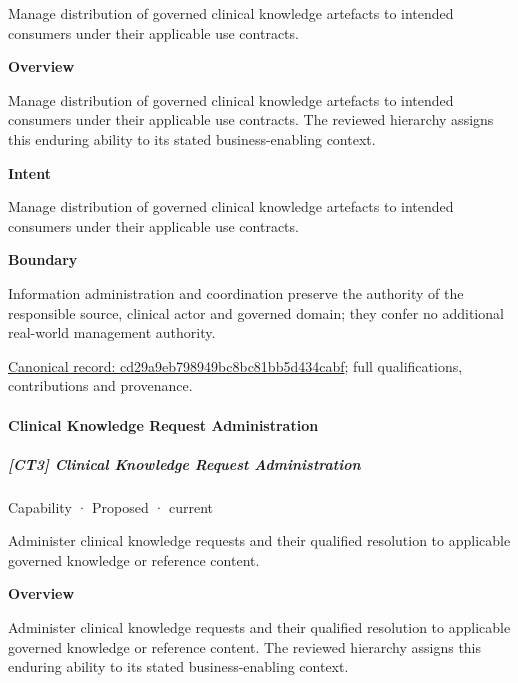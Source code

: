 Manage distribution of governed clinical knowledge artefacts to intended consumers under their applicable use contracts.



\textbf{Overview}



Manage distribution of governed clinical knowledge artefacts to intended consumers under their applicable use contracts. The reviewed hierarchy assigns this enduring ability to its stated business-enabling context.



\textbf{Intent}



Manage distribution of governed clinical knowledge artefacts to intended consumers under their applicable use contracts.



\textbf{Boundary}



Information administration and coordination preserve the authority of the responsible source, clinical actor and governed domain; they confer no additional real-world management authority.


{\footnotesize \href{../../../../continuum/strategy/capability/cd29a9eb798949bc8bc81bb5d434cabf.md}{Canonical record: cd29a9eb798949bc8bc81bb5d434cabf}; full qualifications, contributions and provenance.}\par
\paragraph{Clinical Knowledge Request Administration}

\subparagraph{[CT3] Clinical Knowledge Request Administration}

\label{element:543c53483a2249d78044c6635b7b7c48}
{\small Capability · Proposed · current}\par

Administer clinical knowledge requests and their qualified resolution to applicable governed knowledge or reference content.



\textbf{Overview}



Administer clinical knowledge requests and their qualified resolution to applicable governed knowledge or reference content. The reviewed hierarchy assigns this enduring ability to its stated business-enabling context.



